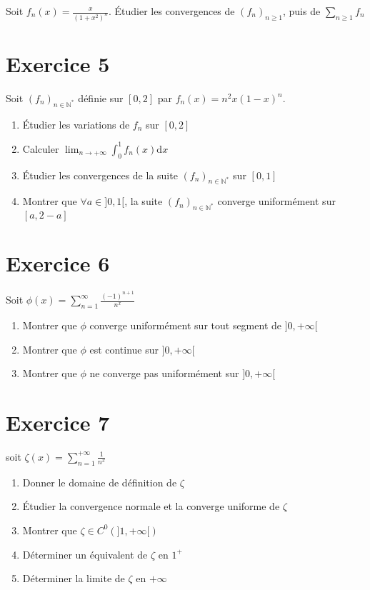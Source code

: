 \documentclass[11pt]{article}
\begin{document}
Soit $f_n(x)=\frac{x}{(1+x^2)^n}$. Étudier les convergences de $(f_n)_{n\geq1}$, puis de $\sum_{n\geq1} f_n$

\section*{Exercice 5}

Soit $(f_n)_{n\in\mathbb{N^*}}$ définie sur $[0,2]$ par $f_n(x)=n^2x(1-x)^n$.

\begin{enumerate}
\item Étudier les variations de $f_n$ sur $[0,2]$
\item Calculer $\lim_{n\to +\infty} \int_0^1 f_n(x)\mathrm{d}x$
\item Étudier les convergences de la suite $(f_n)_{n\in\mathbb{N^*}}$ sur $[0,1]$
\item Montrer que $\forall a\in ]0,1[$,
 la suite $(f_n)_{n\in\mathbb{N^*}}$ converge uniformément sur $[a,2-a]$
\end{enumerate}

\section*{Exercice 6}

Soit $\phi(x) = \sum_{n=1}^\infty \frac{(-1)^{n+1}}{n^x}$
\begin{enumerate}
\item Montrer que $\phi$ converge uniformément sur tout segment de $]0,+\infty[$
\item Montrer que $\phi$ est continue sur $]0,+\infty[$
\item Montrer que $\phi$ ne converge pas uniformément sur $]0,+\infty[$
\end{enumerate}

\section*{Exercice 7}

soit $\zeta(x)=\sum_{n=1}^{+\infty} \frac{1}{n^x}$
\begin{enumerate}
\item Donner le domaine de définition de $\zeta$
\item Étudier la convergence normale et la converge uniforme de $\zeta$
\item Montrer que $\zeta\in C^0(]1,+\infty[)$
\item Déterminer un équivalent de $\zeta$ en $1^{+}$
\item Déterminer la limite de $\zeta$ en $+\infty$
\end{enumerate}
\end{document}
